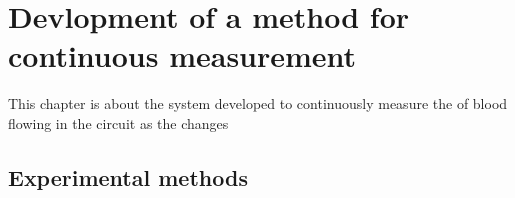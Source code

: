 \chapter{Devlopment of a method for continuous \SOtwo measurement}
\label{ch:contsetup}

This chapter is about the system developed to continuously measure the \Ttwo of blood flowing in the circuit as the \SOtwo changes
\section{Experimental methods}
